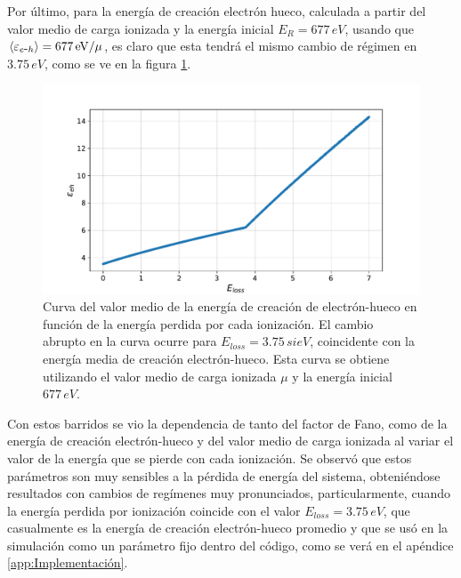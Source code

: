 Por último, para la energía de creación electrón hueco, calculada a partir del valor medio de carga ionizada y la energía inicial $E_{R} = 677\,\si{eV}$, usando que $\mean{\varepsilon_{\eh}} = 677\,\si{eV}/\mu$, es claro que esta tendrá el mismo cambio de régimen en $3.75\,\si{eV}$, como se ve en la figura \ref{fig:CreacionHuecoVsEloss}.
\begin{figure}%
    \centering
    \includegraphics[scale=0.5]{Figs/E_eh_vs_Eloss_5ktrials_0-7Eloss.pdf}
    \caption{\footnotesize{Curva del valor medio de la energía de creación de electrón-hueco en función de la energía perdida por cada ionización. El cambio abrupto en la curva ocurre para $E_{loss} = 3.75\,si{eV}$, coincidente con la energía media de creación electrón-hueco. Esta curva se obtiene utilizando el valor medio de carga ionizada $\mu$ y la energía inicial $677\,\si{eV}$.}}
    \label{fig:CreacionHuecoVsEloss}
\end{figure}
Con estos barridos se vio la dependencia de tanto del factor de Fano, como de la energía de creación electrón-hueco y del valor medio de carga ionizada al variar el valor de la energía que se pierde con cada ionización. Se observó que estos parámetros son muy sensibles a la pérdida de energía del sistema, obteniéndose resultados con cambios de regímenes muy pronunciados, particularmente, cuando la energía perdida por ionización coincide con el valor $E_{loss} = 3.75\,\si{eV}$, que casualmente es la energía de creación electrón-hueco promedio y que se usó en la simulación como un parámetro fijo dentro del código, como se verá en el apéndice \ref{app:Implementación}.

